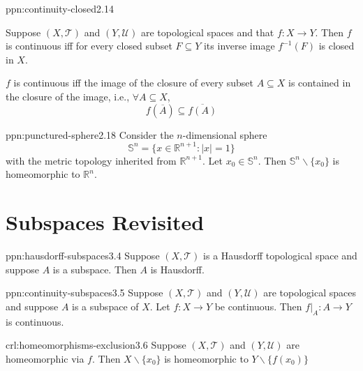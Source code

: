 \documentclass[landscape, 8pt]{extarticle}
\begin{document}
\begin{multicols}{3}
\begin{ppn}{ppn:continuity-closed}{2.14}
    \begin{itemize-zero}
        \item Suppose $(X, \mathcal{T})$ and $(Y, \mathcal{U})$ are topological spaces and that $f : X \to Y$. Then $f$ is continuous iff for every closed subset $F \subseteq Y$ its inverse image $f^{-1}(F)$ is closed in $X$.
        \item $f$ is continuous iff the image of the closure of every subset $A \subseteq X$ is contained in the closure of the image, i.e., $\forall A \subseteq X$,
            \[f(\overline{A}) \subseteq \overline{f(A)}\]
    \end{itemize-zero}
\end{ppn}

\newpage
\begin{ppn}{ppn:punctured-sphere}{2.18}
    Consider the $n$-dimensional sphere
    \[\mathbb{S}^{n} = \{x\in \mathbb{R}^{n+1} : \lvert x \rvert = 1\}\]
    with the metric topology inherited from $\mathbb{R}^{n+1}$. Let $x_{0} \in \mathbb{S}^{n}$. Then $\mathbb{S}^{n} \backslash \{x_{0}\}$ is homeomorphic to $\mathbb{R}^{n}$.
\end{ppn}



\section{Subspaces Revisited}

\begin{ppn}{ppn:hausdorff-subspaces}{3.4}
    Suppose $(X, \mathcal{T})$ is a Hausdorff topological space and suppose $A$ is a subspace. Then $A$ is Hausdorff.
\end{ppn}

\begin{ppn}{ppn:continuity-subspaces}{3.5}
    Suppose $(X, \mathcal{T})$ and $(Y, \mathcal{U})$ are topological spaces and suppose $A$ is a subspace of $X$. Let $f: X \to Y $ be continuous. Then $f \rvert_{A} : A \to Y$ is continuous.
\end{ppn}

\begin{crl}{crl:homeomorphisms-exclusion}{3.6}
    Suppose $(X, \mathcal{T})$ and $(Y, \mathcal{U})$ are homeomorphic via $f$. Then $X \backslash \{x_{0}\}$ is homeomorphic to $Y \backslash \{f(x_{0})\}$
\end{crl}


\end{multicols}
\end{document}
